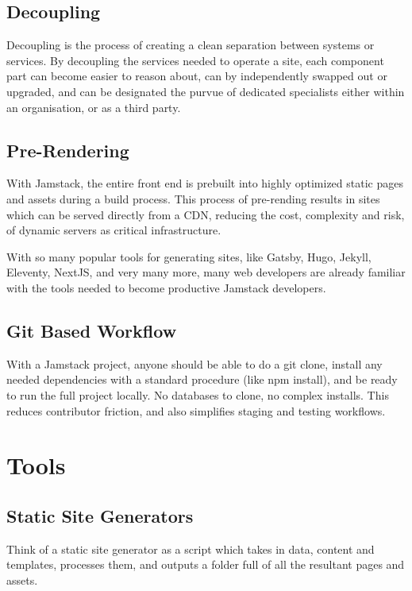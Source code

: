 \documentclass[12pt,a4paper,oneside]{report}
\begin{document}
\subsection{Decoupling}
\par 
Decoupling is the process of creating a clean separation between systems or services. By decoupling the services needed to operate a site, each component part can become easier to reason about, can by independently swapped out or upgraded, and can be designated the purvue of dedicated specialists either within an organisation, or as a third party.
\subsection{Pre-Rendering}
\par
With Jamstack, the entire front end is prebuilt into highly optimized static pages and assets during a build process. This process of pre-rending results in sites which can be served directly from a CDN, reducing the cost, complexity and risk, of dynamic servers as critical infrastructure.
\par
With so many popular tools for generating sites, like Gatsby, Hugo, Jekyll, Eleventy, NextJS, and very many more, many web developers are already familiar with the tools needed to become productive Jamstack developers.

\subsection{Git Based Workflow}
\par 
With a Jamstack project, anyone should be able to do a git clone, install any needed dependencies with a standard procedure (like npm install), and be ready to run the full project locally. No databases to clone, no complex installs. This reduces contributor friction, and also simplifies staging and testing workflows.

\section{Tools}
\subsection{Static Site Generators}
\par 
Think of a static site generator as a script which takes in data, content and templates, processes them, and outputs a folder full of all the resultant pages and assets.
\end{document}
